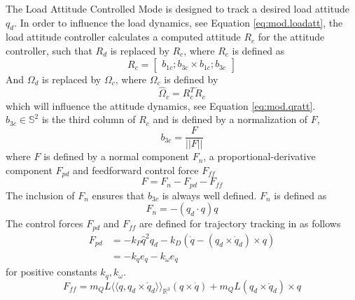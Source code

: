 
The Load Attitude Controlled Mode is designed to track a desired load attitude $ q_d $.
In order to influence the load dynamics, see Equation \ref{eq:mod.loadatt}, the load attitude controller calculates a computed  attitude $ R_c $ for the  attitude controller, such that
$ R_d $ is replaced by $ R_c $, where $ R_c $ is defined as
\begin{equation}\label{eq:con.R}
R_c = \begin{bmatrix}
b_{1c}; b_{3c}\times b_{1c};b_{3c}
\end{bmatrix}
\end{equation}
And $ \Omega_d $ is replaced by $ \Omega_c $, where $ \Omega_c $ is defined by
\begin{equation}\label{key}
\hat{\Omega}_c=R_c^T\dot{R}_c
\end{equation}
which will influence the  attitude dynamics, see Equation \ref{eq:mod.qratt}.\\
$ b_{3c} \in \mathbb{S}^2 $ is the third column of $ R_c $ and is defined by a normalization of $ F $,
\begin{equation}\label{eq:con.b3c}
b_{3c}=\frac{F}{||F||}
\end{equation}
where $F $ is defined by a normal component $ F_n $, a proportional-derivative component $ F_{pd} $ and feedforward control force $ F_{ff}$
\begin{equation}\label{eq:con.F}
F=F_n-F_{pd}-F_{ff}
\end{equation}
The inclusion of $ F_n $ ensures that $ b_{3c} $ is always well defined. $ F_n $ is defined as
\begin{equation}\label{eq:con.Fn}
F_n=-(q_d\cdot q)q
\end{equation}
The control forces $ F_{pd} $ and $ F_{ff} $ are defined for trajectory tracking in \cite[11.2.5]{Bullo2005} as follows
\begin{equation}\label{key}
\begin{aligned}
F_{pd}&=-k_P\hat{q}^2q_d-k_D(\dot{q}-(q_d\times\dot{q}_d)\times q)\\
&=-k_qe_q-k_\omega e_{\dot{q}}
\end{aligned}
\end{equation}
for positive constants $ k_q, k_\omega $.\\
\begin{equation}\label{key}
F_{ff}=m_QL\langle\!\langle q,q_d\times\dot{q}_d\rangle\!\rangle_{\mathbb{R}^3}(q\times \dot{q})+m_QL(q_d\times \ddot{q}_d)\times q
\end{equation}

